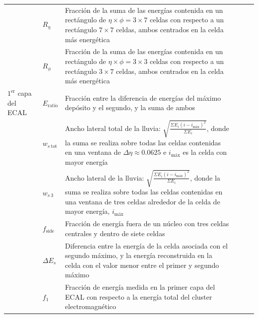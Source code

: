 \begin{table}
\begin{tabular}{ p{2.1cm} l p{8cm} c c c}
		 & $R_{\eta}$ & Fracción de la suma de las energías contenida en un rectángulo de $\eta\times\phi = 3\times7$ celdas con respecto a un rectángulo $7\times7$ celdas, ambos centrados en la celda más energética & \cmark & \cmark & \cmark \\

		 & $R_{\phi}$ & Fracción de la suma de las energías contenida en un rectángulo de $\eta\times\phi = 3\times3$ celdas con respecto a un rectángulo $3\times7$ celdas, ambos centrados en la celda más energética & \xmark & \xmark & \cmark \\

		\hline

		$1^{\text{er}}$ capa del ECAL & $E_{\text{ratio}}$ & Fracción entre la diferencia de energías del máximo depósito y el segundo, y la suma de ambos & \xmark & \cmark & \cmark \\

		 & $w_{s\:\text{tot}}$ & Ancho lateral total de la lluvia: $\sqrt{\frac{\Sigma E_{i}(i-i_{\text{máx}})^{2}}{\Sigma E_{i}}}$, donde la suma se realiza sobre todas las celdas contenidas en una ventana de $\Delta\eta\approx0.0625$ e $i_{\text{máx}}$ es la celda con mayor energía & \xmark & \xmark & \cmark \\

		 & $w_{s\:\text{3}}$ & Ancho lateral de la lluvia: $\sqrt{\frac{\Sigma E_{i}(i-i_{\text{máx}})^{2}}{\Sigma E_{i}}}$, donde la suma se realiza sobre todas las celdas contenidas en una ventana de tres celdas alrededor de la celda de mayor energía, $i_{\text{máx}}$ & \xmark & \xmark & \cmark \\

		 & $f_{\text{side}}$ & Fracción de energía fuera de un núcleo con tres celdas centrales y dentro de siete celdas & \xmark & \xmark & \cmark \\

		 & $\Delta E_{s}$ & Diferencia entre la energía de la celda asociada con el segundo máximo, y la energía reconstruida en la celda con el valor menor entre el primer y segundo máximo & \xmark & \xmark & \cmark \\

		 & $f_{\text{1}}$ & Fracción de energía medida en la primer capa del ECAL con respecto a la energía total del cluster electromagnético & \xmark & \xmark & \cmark \\

     \hline
     \hline

	\end{tabular}

\label{tab:phIDVars}
\end{table}




